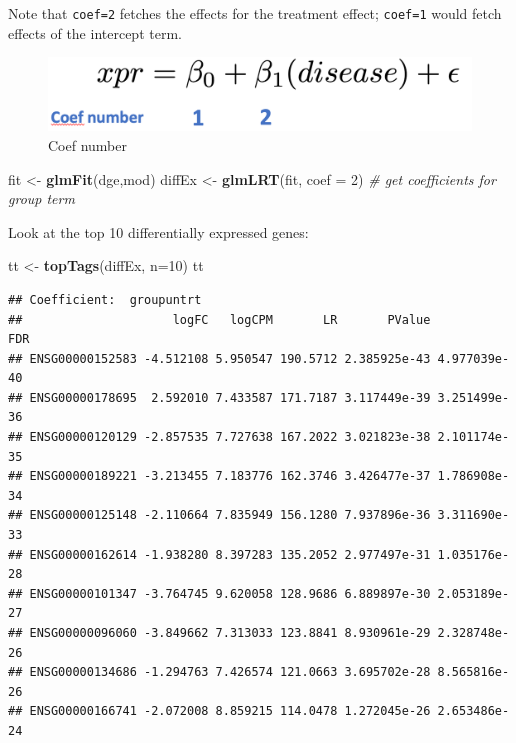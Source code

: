 \documentclass[
]{book}
\newenvironment{Shaded}{\begin{snugshade}}{\end{snugshade}}
\newcommand{\AttributeTok}[1]{\textcolor[rgb]{0.13,0.29,0.53}{#1}}
\newcommand{\CommentTok}[1]{\textcolor[rgb]{0.56,0.35,0.01}{\textit{#1}}}
\newcommand{\DecValTok}[1]{\textcolor[rgb]{0.00,0.00,0.81}{#1}}
\newcommand{\FunctionTok}[1]{\textcolor[rgb]{0.13,0.29,0.53}{\textbf{#1}}}
\newcommand{\NormalTok}[1]{#1}
\newcommand{\OtherTok}[1]{\textcolor[rgb]{0.56,0.35,0.01}{#1}}
\begin{document}
Note that \texttt{coef=2} fetches the effects for the treatment effect; \texttt{coef=1} would fetch effects of the intercept term.

\begin{figure}
\centering
\includegraphics{img/img-1.png}
\caption{Coef number}
\end{figure}

\begin{Shaded}
\begin{Highlighting}[]
\NormalTok{fit }\OtherTok{\textless{}{-}} \FunctionTok{glmFit}\NormalTok{(dge,mod)}
\NormalTok{diffEx }\OtherTok{\textless{}{-}} \FunctionTok{glmLRT}\NormalTok{(fit, }\AttributeTok{coef =} \DecValTok{2}\NormalTok{) }\CommentTok{\# get coefficients for group term}
\end{Highlighting}
\end{Shaded}

Look at the top 10 differentially expressed genes:

\begin{Shaded}
\begin{Highlighting}[]
\NormalTok{tt }\OtherTok{\textless{}{-}} \FunctionTok{topTags}\NormalTok{(diffEx, }\AttributeTok{n=}\DecValTok{10}\NormalTok{)}
\NormalTok{tt}
\end{Highlighting}
\end{Shaded}

\begin{verbatim}
## Coefficient:  groupuntrt 
##                     logFC   logCPM       LR       PValue          FDR
## ENSG00000152583 -4.512108 5.950547 190.5712 2.385925e-43 4.977039e-40
## ENSG00000178695  2.592010 7.433587 171.7187 3.117449e-39 3.251499e-36
## ENSG00000120129 -2.857535 7.727638 167.2022 3.021823e-38 2.101174e-35
## ENSG00000189221 -3.213455 7.183776 162.3746 3.426477e-37 1.786908e-34
## ENSG00000125148 -2.110664 7.835949 156.1280 7.937896e-36 3.311690e-33
## ENSG00000162614 -1.938280 8.397283 135.2052 2.977497e-31 1.035176e-28
## ENSG00000101347 -3.764745 9.620058 128.9686 6.889897e-30 2.053189e-27
## ENSG00000096060 -3.849662 7.313033 123.8841 8.930961e-29 2.328748e-26
## ENSG00000134686 -1.294763 7.426574 121.0663 3.695702e-28 8.565816e-26
## ENSG00000166741 -2.072008 8.859215 114.0478 1.272045e-26 2.653486e-24
\end{verbatim}
\end{document}
